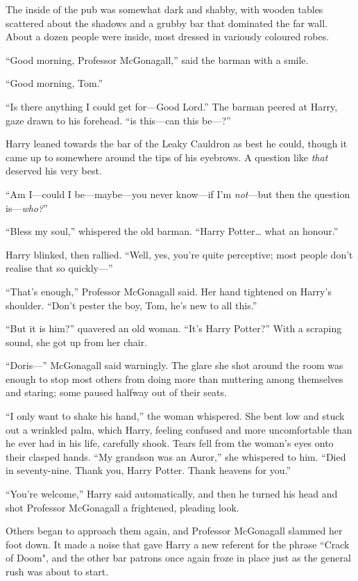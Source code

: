 The inside of the pub was somewhat dark and shabby, with
wooden tables scattered about the shadows and a grubby
bar that dominated the far wall. About a dozen people
were inside, most dressed in variously coloured robes.

“Good morning, Professor McGonagall,” said the barman
with a smile.

“Good morning, Tom.”

“Is there anything I could get for—Good Lord.” The barman
peered at Harry, gaze drawn to his forehead. “is this—can this be—?”

Harry leaned towards the bar of the Leaky Cauldron as best he could, though it
came up to somewhere around the tips of his eyebrows. A question like
\emph{that} deserved his very best.

“Am I—could I be—maybe—you never know—if I’m \emph{not}—but then the
question is—\emph{who?}”

“Bless my soul,” whispered the old barman. “Harry Potter… what an
honour.”

Harry blinked, then rallied. “Well, yes, you’re quite perceptive; most people
don’t realise that so quickly—”

“That’s enough,” Professor McGonagall said. Her hand tightened on Harry’s
shoulder. “Don’t pester the boy, Tom, he’s new to all this.”

“But it is him?” quavered an old woman. “It’s Harry Potter?” With a scraping
sound, she got up from her chair.

“Doris—” McGonagall said warningly. The glare she shot around the room
was enough to stop most others from doing
more than muttering among themselves and staring;
some paused halfway out of their seats.

“I only want to shake his hand,” the woman whispered. She bent low and stuck
out a wrinkled palm, which Harry, feeling confused and more uncomfortable than
he ever had in his life, carefully shook. Tears fell from the woman’s eyes onto
their clasped hands. “My grandson was an Auror,” she whispered to him. “Died in
seventy-nine. Thank you, Harry Potter. Thank heavens for you.”

“You’re welcome,” Harry said automatically, and then he turned his head and
shot Professor McGonagall a frightened, pleading look.

Others began to approach them again, and Professor
McGonagall slammed her foot down. It made a noise that
gave Harry a new referent for the phrase “Crack of
Doom", and the other bar patrons once again froze in
place just as the general rush was about to start.

